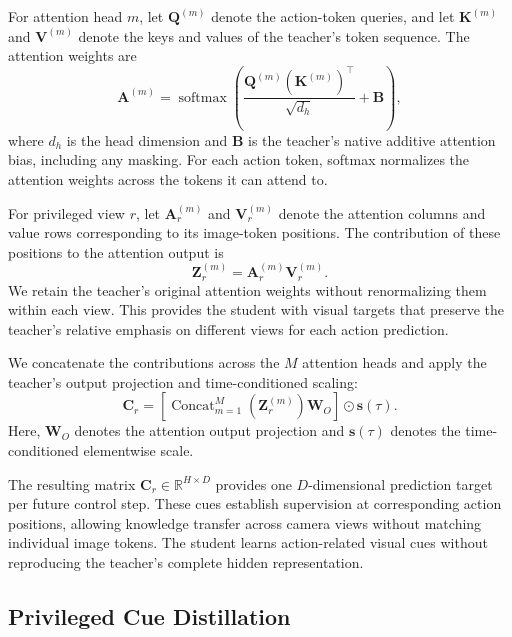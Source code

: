 \documentclass{ELSP}
\begin{document}
For attention head $m$, let $\mathbf{Q}^{(m)}$ denote the action-token
queries, and let $\mathbf{K}^{(m)}$ and $\mathbf{V}^{(m)}$ denote the
keys and values of the teacher's token sequence. The attention weights
are
\begin{equation}
\mathbf{A}^{(m)}
=
\operatorname{softmax}\!\left(
\frac{\mathbf{Q}^{(m)}(\mathbf{K}^{(m)})^{\top}}{\sqrt{d_h}}
+\mathbf{B}
\right),
\end{equation}
where $d_h$ is the head dimension and $\mathbf{B}$ is the teacher's
native additive attention bias, including any masking. For each action
token, softmax normalizes the attention weights across the tokens it
can attend to.

For privileged view $r$, let $\mathbf{A}_r^{(m)}$ and
$\mathbf{V}_r^{(m)}$ denote the attention columns and value rows
corresponding to its image-token positions. The contribution of
these positions to the attention output is
\begin{equation}
\mathbf{Z}_r^{(m)}
=
\mathbf{A}_r^{(m)}\mathbf{V}_r^{(m)}.
\end{equation}
We retain the teacher's original attention weights without renormalizing
them within each view. This provides the student with visual targets
that preserve the teacher's relative emphasis on different views for
each action prediction.

We concatenate the contributions across the $M$ attention heads and
apply the teacher's output projection and time-conditioned scaling:
\begin{equation}
\mathbf{C}_r
=
\left[
\operatorname{Concat}_{m=1}^{M}\!\left(\mathbf{Z}_r^{(m)}\right)
\mathbf{W}_O
\right]
\odot\mathbf{s}(\tau).
\label{eq:cue}
\end{equation}
Here, $\mathbf{W}_O$ denotes the attention output projection and
$\mathbf{s}(\tau)$ denotes the time-conditioned elementwise scale.

The resulting matrix $\mathbf{C}_r\in\mathbb{R}^{H\times D}$
provides one $D$-dimensional prediction target per future control
step. These cues establish supervision at corresponding action
positions, allowing knowledge transfer across camera views
without matching individual image tokens. The student learns
action-related visual cues without reproducing the teacher's
complete hidden representation.

\subsection{Privileged Cue Distillation}
\label{sec:cue_fusion}
\end{document}
